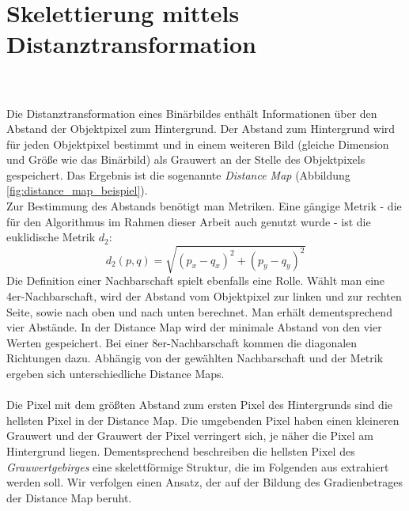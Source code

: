 \newpage
\section{Skelettierung mittels Distanztransformation}
\label{sec:distanztransformation}
\\\\
Die Distanztransformation eines Binärbildes enthält Informationen über den Abstand der Objektpixel zum Hintergrund. Der Abstand zum Hintergrund wird für jeden Objektpixel bestimmt und in einem
weiteren Bild (gleiche Dimension und Größe wie das Binärbild) als Grauwert an der Stelle des Objektpixels gespeichert. Das Ergebnis ist die sogenannte \emph{Distance Map} (Abbildung \ref{fig:distance_map_beispiel}). \\
Zur Bestimmung des Abstands benötigt man Metriken. Eine gängige Metrik - die für den Algorithmus im Rahmen dieser Arbeit auch genutzt wurde - ist die euklidische Metrik $d_2$:
\begin{equation}
\label{eq:d2}
d_2(p,q) = \sqrt{(p_x - q_x)^2 + (p_y - q_y)^2}  
\end{equation}
Die Definition einer Nachbarschaft spielt
ebenfalls eine Rolle. Wählt man eine
4er-Nachbarschaft, wird der Abstand vom Objektpixel zur linken und zur rechten Seite, sowie nach oben und nach unten berechnet. Man erhält dementsprechend
vier Abstände. In der Distance Map wird der minimale Abstand von den vier Werten gespeichert. Bei einer 8er-Nachbarschaft
kommen die diagonalen Richtungen dazu. Abhängig von der gewählten
Nachbarschaft und der Metrik ergeben sich unterschiedliche Distance
Maps.\\\\
Die Pixel mit dem größten Abstand zum ersten Pixel des Hintergrunds sind die hellsten Pixel in der Distance Map. Die umgebenden Pixel haben einen kleineren Grauwert und der Grauwert der Pixel verringert sich, je näher die Pixel am Hintergrund liegen.
Dementsprechend beschreiben die hellsten Pixel des \emph{Grauwertgebirges} eine skelettförmige Struktur, die im Folgenden aus extrahiert werden soll.
Wir verfolgen einen Ansatz, der auf der Bildung des Gradienbetrages der Distance Map beruht.\\
